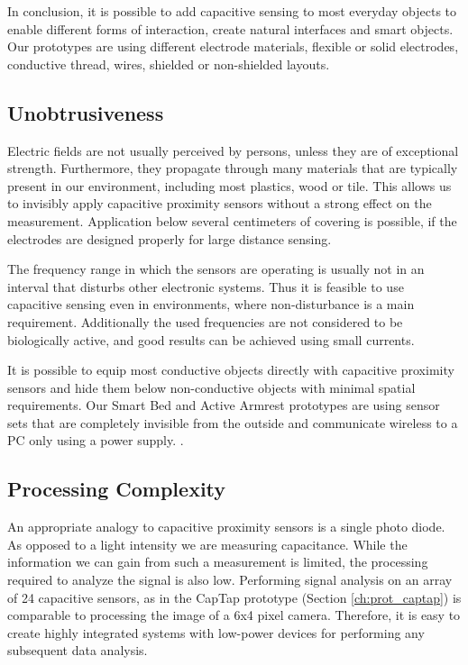 In conclusion, it is possible to add capacitive sensing to most everyday objects to enable different forms of interaction, create natural interfaces and smart objects. Our prototypes are using different electrode materials, flexible or solid electrodes, conductive thread, wires, shielded or non-shielded layouts.
 
\subsection{Unobtrusiveness}
Electric fields are not usually perceived by persons, unless they are of exceptional strength. Furthermore, they propagate through many materials that are typically present in our environment, including most plastics, wood or tile. This allows us to invisibly apply capacitive proximity sensors without a strong effect on the measurement. Application below several centimeters of covering is possible, if the electrodes are designed properly for large distance sensing.

The frequency range in which the sensors are operating is usually not in an interval that disturbs other electronic systems. Thus it is feasible to use capacitive sensing even in environments, where non-disturbance is a main requirement.  Additionally the used frequencies are not considered to be biologically active, and good results can be achieved using small currents. 

It is possible to equip most conductive objects directly with capacitive proximity sensors and hide them below non-conductive objects with minimal spatial requirements. Our Smart Bed and Active Armrest prototypes are using sensor sets that are completely invisible from the outside and communicate wireless to a PC only using a power supply. .
 
\subsection{Processing Complexity}
An appropriate analogy to capacitive proximity sensors is a single photo diode. As opposed to a light intensity we are measuring capacitance. While the information we can gain from such a measurement is limited, the processing required to analyze the signal is also low. Performing signal analysis on an array of 24 capacitive sensors, as in the CapTap prototype (Section \ref{ch:prot_captap}) is comparable to processing the image of a 6x4 pixel camera. Therefore, it is easy to create highly integrated systems with low-power devices for performing any subsequent data analysis. 

